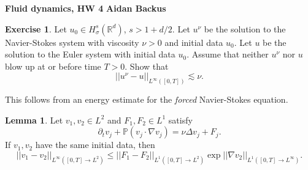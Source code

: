 \documentclass[10pt]{article}
\newcommand{\RR}{\mathbb{R}}
\newcommand{\PP}{\mathbb P}
\theoremstyle{definition}
\newtheorem{exer}{Exercise}
\newtheorem{lemma}{Lemma}[exer]
\begin{document}
\noindent
\large\textbf{Fluid dynamics, HW 4} \hfill \textbf{Aidan Backus} \\

\begin{exer}
Let $u_0 \in H^s_\sigma(\RR^d)$, $s > 1 + d/2$. Let $u^\nu$ be the solution to the Navier-Stokes system with viscosity $\nu > 0$ and initial data $u_0$.
Let $u$ be the solution to the Euler system with initial data $u_0$.
Assume that neither $u^\nu$ nor $u$ blow up at or before time $T > 0$.
Show that
$$||u^\nu - u||_{L^\infty([0, T])} \lesssim \nu.$$
\end{exer}

This follows from an energy estimate for the \emph{forced} Navier-Stokes equation.
\begin{lemma}
Let $v_1, v_2 \in L^2$ and $F_1, F_2 \in L^1$ satisfy
\begin{equation}
\label{forced equation}
\partial_t v_j + \PP(v_j \cdot \nabla v_j) = \nu \Delta v_j + F_j.
\end{equation}
If $v_1,v_2$ have the same initial data, then
\begin{equation}
\label{forced energy}
||v_1 - v_2||_{L^\infty([0, T] \to L^2)} \leq ||F_1 - F_2||_{L^1([0, T] \to L^2)} \exp||\nabla v_2||_{L^1([0, T] \to L^\infty)}.
\end{equation}
\end{lemma}
\end{document}
